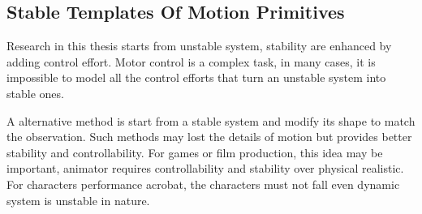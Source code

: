 \subsection{Stable Templates Of Motion Primitives}

Research in this thesis starts from unstable system,  stability are enhanced by adding control effort.
Motor control is a complex task, in many cases, it is impossible to model all the control efforts that turn an unstable system into stable ones.


A alternative method is start from a stable system and modify its shape to match the observation.
Such methods may lost the details of motion but provides better stability and controllability. 
For games or film production, this idea may be important, animator requires controllability and stability over physical realistic.
For characters performance acrobat, the characters must not fall even dynamic system is unstable in nature.




